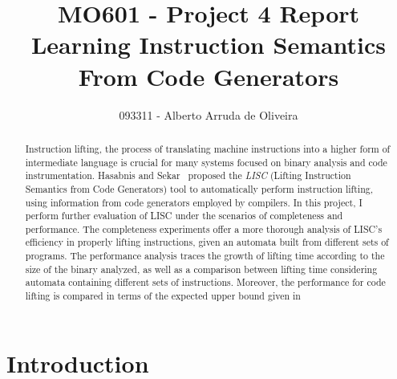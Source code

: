 \documentclass[12pt]{article}
\title{MO601 - Project 4 Report \\ Learning Instruction Semantics From Code Generators}
\author{093311 - Alberto Arruda de Oliveira\inst{1}}
\begin{document}
\maketitle

\begin{abstract}

Instruction lifting, the process of translating machine instructions into a higher form of intermediate language is crucial for many systems focused on binary analysis and code instrumentation. Hasabnis and Sekar~\cite{Hasabnis2014} proposed the \textit{LISC} (Lifting Instruction Semantics from Code Generators) tool to automatically perform instruction lifting, using information from code generators employed by compilers. In this project, I perform further evaluation of LISC under the scenarios of completeness and performance. The completeness experiments offer a more thorough analysis of LISC's efficiency in properly lifting instructions, given an automata built from different sets of programs. The performance analysis traces the growth of lifting time according to the size of the binary analyzed, as well as a comparison between lifting time considering automata containing different sets of instructions. Moreover, the performance for code lifting is compared in terms of the expected upper bound given in~\cite{Hasabnis2014}

\end{abstract}


\section{Introduction} \label{sec:intro}
\end{document}
